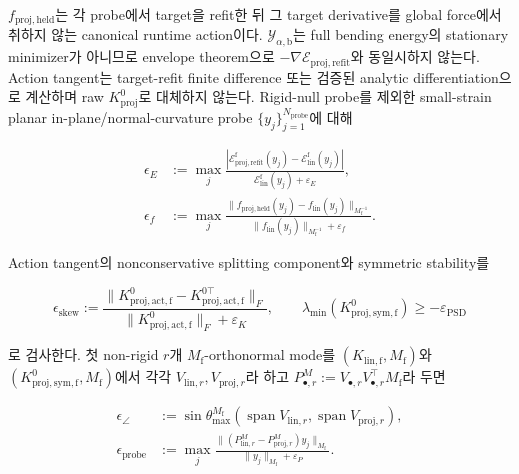 \documentclass[11pt,a4paper]{article}
\newcommand{\eps}{\varepsilon}
\begin{document}
\(f_{\mathrm{proj,held}}\)는 각 probe에서 target을 refit한 뒤 그 target derivative를 global force에서
취하지 않는 canonical runtime action이다. \(\mathcal Y_{\alpha,\mathrm b}\)는 full bending energy의
stationary minimizer가 아니므로 envelope theorem으로
\(-\nabla\mathcal E_{\mathrm{proj,refit}}\)와 동일시하지 않는다.
Action tangent는 target-refit finite difference 또는 검증된 analytic differentiation으로 계산하며
raw \(K_{\mathrm{proj}}^0\)로 대체하지 않는다.
Rigid-null probe를 제외한 small-strain planar in-plane/normal-curvature probe
\(\{y_j\}_{j=1}^{N_{\mathrm{probe}}}\)에 대해

\begin{equation}
\begin{aligned}
  \epsilon_E
  &:={}\max_j
  \frac{|\mathcal E_{\mathrm{proj,refit}}^{\mathrm f}(y_j)
         -\mathcal E_{\mathrm{lin}}^{\mathrm f}(y_j)|}
       {\mathcal E_{\mathrm{lin}}^{\mathrm f}(y_j)+\eps_E},\\
  \epsilon_f
  &:={}\max_j
  \frac{\|f_{\mathrm{proj,held}}(y_j)-f_{\mathrm{lin}}(y_j)\|_{M_{\mathrm f}^{-1}}}
       {\|f_{\mathrm{lin}}(y_j)\|_{M_{\mathrm f}^{-1}}+\eps_f}.
  \label{eq:klin-projective-action-error}
\end{aligned}
\end{equation}

Action tangent의 nonconservative splitting component와 symmetric stability를

\begin{equation}
  \epsilon_{\mathrm{skew}}
  :=\frac{\|K_{\mathrm{proj,act,f}}^0-K_{\mathrm{proj,act,f}}^{0\top}\|_F}
           {\|K_{\mathrm{proj,act,f}}^0\|_F+\eps_K},
  \qquad
  \lambda_{\min}(K_{\mathrm{proj,sym,f}}^0)\ge-\eps_{\mathrm{PSD}}
  \label{eq:projective-action-tangent-check}
\end{equation}

로 검사한다. 첫 non-rigid \(r\)개 \(M_{\mathrm f}\)-orthonormal mode를
\((K_{\mathrm{lin,f}},M_{\mathrm f})\)와
\((K_{\mathrm{proj,sym,f}}^0,M_{\mathrm f})\)에서 각각
\(V_{\mathrm{lin},r},V_{\mathrm{proj},r}\)라 하고
\(P_{\bullet,r}^{M}:=V_{\bullet,r}V_{\bullet,r}^\top M_{\mathrm f}\)라 두면

\begin{equation}
\begin{aligned}
  \epsilon_\angle
  &:={}\sin\theta_{\max}^{M_{\mathrm f}}
  (\operatorname{span}V_{\mathrm{lin},r},
   \operatorname{span}V_{\mathrm{proj},r}),\\
  \epsilon_{\mathrm{probe}}
  &:={}\max_j
  \frac{\|(P_{\mathrm{lin},r}^{M}-P_{\mathrm{proj},r}^{M})y_j\|_{M_{\mathrm f}}}
       {\|y_j\|_{M_{\mathrm f}}+\eps_P}.
  \label{eq:klin-projective-subspace-error}
\end{aligned}
\end{equation}
\end{document}

